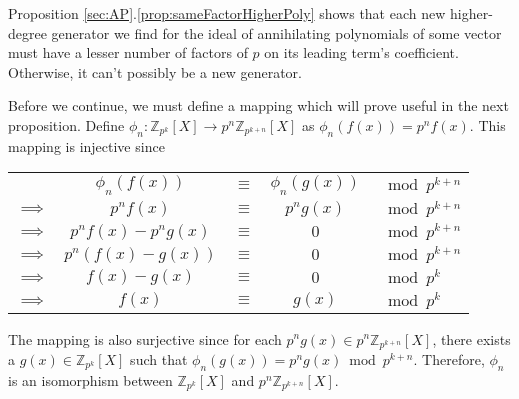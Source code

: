 \documentclass[a4paper, reqno, 12pt]{amsart}
\begin{document}
		Proposition \ref{sec:AP}.\ref{prop:sameFactorHigherPoly} shows that each new higher-degree generator we find for the ideal of annihilating polynomials of some 
		vector must have a lesser number of factors of $p$ on its leading term's coefficient. Otherwise, it can't possibly be a new generator.
		
		Before we continue, we must define a mapping which will prove useful in the next proposition. Define 
		$\phi_n : \mathds{Z}_{p^k}[X] \rightarrow p^n\mathds{Z}_{p^{k+n}}[X]$ as $\phi_n(f(x)) = p^nf(x)$. This mapping is injective since
		\begin{center}
			\begin{tabular}{ccccl}
						   & $\phi_n(f(x))$      & $\equiv$ & $\phi_n(g(x))$ & $\mod{p^{k+n}}$ \\
				$\implies$ & $p^nf(x)$           & $\equiv$ & $p^ng(x)$      & $\mod{p^{k+n}}$ \\
				$\implies$ & $p^nf(x) - p^ng(x)$ & $\equiv$ & $0$            & $\mod{p^{k+n}}$ \\
				$\implies$ & $p^n(f(x) - g(x))$  & $\equiv$ & $0$            & $\mod{p^{k+n}}$ \\
				$\implies$ & $f(x) - g(x)$       & $\equiv$ & $0$            & $\mod{p^k}$     \\
				$\implies$ & $f(x)$              & $\equiv$ & $g(x)$         & $\mod{p^k}$
			\end{tabular}
		\end{center}
		
		The mapping is also surjective since for each $p^ng(x) \in p^n\mathds{Z}_{p^{k+n}}[X]$, there exists a $g(x) \in \mathds{Z}_{p^k}[X]$ such that 
		$\phi_n(g(x)) = p^ng(x) \bmod{p^{k+n}}$. Therefore, $\phi_n$ is an isomorphism between $\mathds{Z}_{p^k}[X]$ and $p^n\mathds{Z}_{p^{k+n}}[X]$.
		
\end{document}
